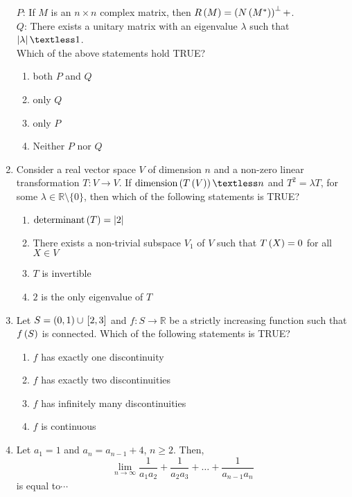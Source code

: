 \documentclass[journal,12pt,twocolumn]{IEEEtran}
\theoremstyle{remark}
\begin{document}
\begin{enumerate}[start=1]
         $P$: If $M$ is an $n \times n$ complex matrix, then $R\left(M\right) = \left(N\left(M^*\right)\right)^\perp+$.\\
        $Q$: There exists a unitary matrix with an eigenvalue $\lambda$ such that $\abs{\lambda} \textless 1$.\\
    Which of the above statements hold TRUE?
    \begin{enumerate}
        \item both $P$ and $Q$
        \item only $Q$
        \item only $P$
        \item Neither $P$ nor $Q$
    \end{enumerate}

    \item Consider a real vector space $V$ of dimension $n$ and a non-zero linear transformation $T: V \to V$. If $\text{dimension}\brak{T\brak{V}} \textless n$ and $T^2 = \lambda T$, for some $\lambda \in \mathbb{R} \setminus \{0\}$, then which of the following statements is TRUE?
    \begin{enumerate}
        \item $\text{determinant}\left(T\right) = \left\vert2\right\vert$
        \item There exists a non-trivial subspace $V_1$ of $V$ such that $T\left(X\right) = 0$ for all $X \in V$
        \item $T$ is invertible
        \item $2$ is the only eigenvalue of $T$
    \end{enumerate}

    \item Let $S = \left(0,1\right) \cup {}\left[2,3\right]$ and $f: S \to \mathbb{R}$ be a strictly increasing function such that $f\left(S\right)$ is connected. Which of the following statements is TRUE?
    \begin{enumerate}
        \item $f$ has exactly one discontinuity
        \item $f$ has exactly two discontinuities
        \item $f$ has infinitely many discontinuities
        \item $f$ is continuous
    \end{enumerate}

    \item Let $a_1 = 1$ and $a_n = a_{n-1} + 4$, $n \geq 2$. Then,
    $$\lim_{n \to \infty} \frac{1}{a_1 a_2} + \frac{1}{a_2 a_3} + \dots + \frac{1}{a_{n-1} a_n}$$
    is equal to$\cdots$


\end{enumerate}
\end{document}
